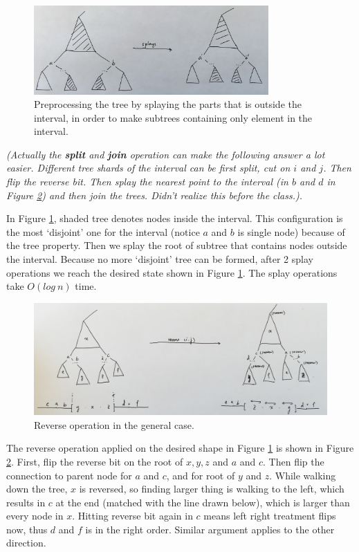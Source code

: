 \documentclass[10pt,letter]{article}
\begin{document}
\begin{figure}
	\centering
	\includegraphics[width=0.8\textwidth]{4-1.jpg}
	\caption{Preprocessing the tree by splaying the parts that is outside the interval, in order to make subtrees containing only element in the interval.} \label{fig:4-1}
\end{figure}

\emph{(Actually the \textbf{split} and \textbf{join} operation can make the following answer a lot easier. Different tree shards of the interval can be first split, cut on $i$ and $j$. Then flip the reverse bit. Then splay the nearest point to the interval (in $b$ and $d$ in Figure \ref{fig:4-2}) and then join the trees. Didn't realize this before the class.).}

In Figure \ref{fig:4-1}, shaded tree denotes nodes inside the interval. This configuration is the most `disjoint' one for the interval (notice $a$ and $b$ is single node) because of the tree property. Then we splay the root of subtree that contains nodes outside the interval. Because no more `disjoint' tree can be formed, after 2 splay operations we reach the desired state shown in Figure \ref{fig:4-1}. The splay operations take $O(log\:n)$ time. 

\begin{figure}
	\centering
	\includegraphics[width=1\textwidth]{4-2.jpg}
	\caption{Reverse operation in the general case.} \label{fig:4-2}
\end{figure}

The reverse operation applied on the desired shape in Figure \ref{fig:4-1} is shown in Figure \ref{fig:4-2}. First, flip the reverse bit on the root of $x, y, z$ and $a$ and $c$. Then flip the connection to parent node for $a$ and $c$, and for root of $y$ and $z$. While walking down the tree, $x$ is reversed, so finding larger thing is walking to the left, which results in $c$ at the end (matched with the line drawn below), which is larger than every node in $x$. Hitting reverse bit again in $c$ means left right treatment flips now, thus $d$ and $f$ is in the right order. Similar argument applies to the other direction. 
\end{document}
